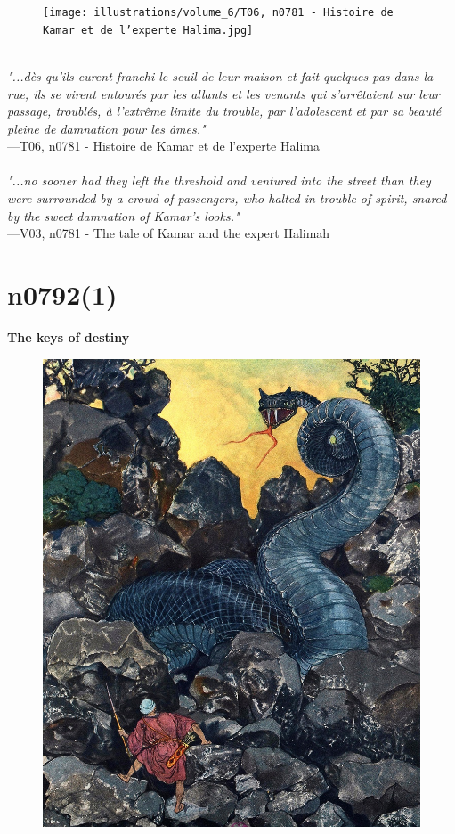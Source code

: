 \documentclass[../Carre_nights.tex]{subfiles}
\begin{document}
\begin{figure}[ht]
\centering
\texttt{[image: illustrations/volume\_6/T06, n0781 - Histoire de Kamar et de l’experte Halima.jpg]}
\end{figure}

\textit{\\
"...dès qu’ils eurent franchi le seuil de leur maison et fait quelques pas dans la rue, ils se virent entourés par les allants et les venants qui s’arrêtaient sur leur passage, troublés, à l’extrême limite du trouble, par l’adolescent et par sa beauté pleine de damnation pour les âmes."} \\
—T06, n0781 - Histoire de Kamar et de l’experte Halima \\~\\
\textit{"...no sooner had they left the threshold and ventured into the street than they were surrounded by a crowd of passengers, who halted in trouble of spirit, snared by the sweet damnation of Kamar's looks."} \\
—V03, n0781 - The tale of Kamar and the expert Halimah

\newpage

\section{n0792(1)}
\textbf{\Large{The keys of destiny}} \\

\begin{figure}[ht]
\centering
\includegraphics[height=\figsize]{illustrations/volume_6/T06, n0792(1) - Les clefs du destin.jpg}
\end{figure}
\end{document}
